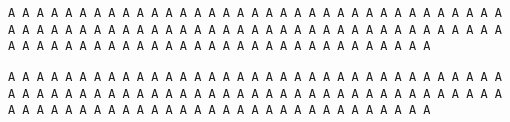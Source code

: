 \documentclass{article}
\begin{document}
\null
\begin{verbatim}
A A A A A A A A A A A A A A A A A A A A A A A A A A A A A A A A A A A A A A A A A A A A A A A A A A A A A A A A A A A A A A A A A A A A A A A A A A A A A A A A A A A A A A A A A A A A A A A A A A A A 
\end{verbatim}

\begin{lstlisting}
A A A A A A A A A A A A A A A A A A A A A A A A A A A A A A A A A A A A A A A A A A A A A A A A A A A A A A A A A A A A A A A A A A A A A A A A A A A A A A A A A A A A A A A A A A A A A A A A A A A A 
\end{lstlisting}
\end{document}
